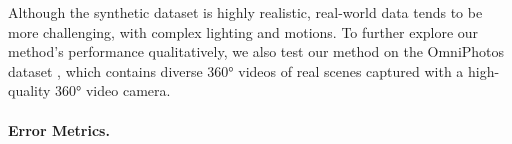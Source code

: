 Although the synthetic dataset is highly realistic, real-world data tends to be more challenging, with complex lighting and motions.
%
To further explore our method's performance qualitatively, we also test our method on the OmniPhotos dataset \cite{BerteYLR2020}, which contains diverse 360° videos of real scenes captured with a high-quality 360° video camera.


\paragraph{Error Metrics.}

